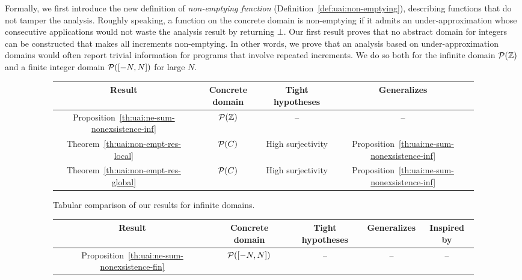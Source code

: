 Formally, we first introduce the new definition of \emph{non-emptying function} (Definition~\ref{def:uai:non-emptying}), describing functions that do not tamper the analysis. Roughly speaking, a function on the concrete domain is non-emptying if it admits an under-approximation whose consecutive applications would not waste the analysis result by returning $\bot$.
Our first result proves that no abstract domain for integers can be constructed that makes all increments non-emptying. In other words, we prove that an analysis based on under-approximation domains would often report trivial information for programs that involve repeated increments. We do so both for the infinite domain $\mathcal{P}(\mathbb{Z})$ and a finite integer domain $\mathcal{P}([-N, N])$ for large $N$.

\begin{figure}[t]
	\begin{subfigure}{\textwidth}
		\centering
		\begin{tabular}{c|ccc}
			Result                                            & Concrete domain & Tight hypotheses  & Generalizes                                       \\
			\hline
			Proposition~\ref{th:uai:ne-sum-nonexsistence-inf} & $\mathcal{P}(\mathbb{Z})$   & --                & --                                                \\
			Theorem~\ref{th:uai:non-empt-res-local}           & $\mathcal{P}(C)$       & High surjectivity & Proposition~\ref{th:uai:ne-sum-nonexsistence-inf} \\
			Theorem~\ref{th:uai:non-empt-res-global}          & $\mathcal{P}(C)$       & High surjectivity & Proposition~\ref{th:uai:ne-sum-nonexsistence-inf} \\
		\end{tabular}
		\caption{Tabular comparison of our results for infinite domains.}
		\label{fig:uai:tab-summary-infinite}
		\vspace{1ex}
	\end{subfigure}
	\begin{subfigure}{\textwidth}
		\centering
		\begin{tabular}{c|cccc}
			Result                                            & Concrete domain & Tight hypotheses & Generalizes                                       & Inspired by                              \\
			\hline
			Proposition~\ref{th:uai:ne-sum-nonexsistence-fin} & $\mathcal{P}([-N, N])$ & --               & --                                                & --                                       \\

\end{tabular}
\end{subfigure}
\end{figure}
